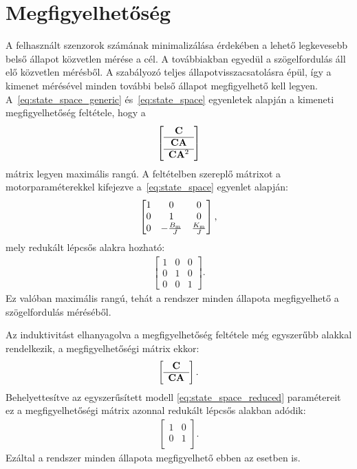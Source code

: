 \section{Megfigyelhetőség}\label{chap:observability}
A felhasznált szenzorok számának minimalizálása érdekében a lehető legkevesebb belső állapot közvetlen mérése 
a cél. A továbbiakban egyedül a szögelfordulás áll elő közvetlen mérésből. 
A szabályozó teljes állapotvisszacsatolásra épül, így a kimenet mérésével minden további belső állapot 
megfigyelhető kell legyen. 
A~\eqref{eq:state_space_generic} és~\eqref{eq:state_space} egyenletek alapján a kimeneti megfigyelhetőség feltétele, hogy a
\begin{align}\label{eq:observability_generic}
    \left[\begin{array}{c}
        \mathbf{C} \\ \hline
        \mathbf{CA} \\ \hline
        \mathbf{C} \mathbf{A}^2
    \end{array}\right]
\end{align}
mátrix legyen maximális rangú. A feltételben szereplő mátrixot a motorparaméterekkel kifejezve 
a~\eqref{eq:state_space} egyenlet alapján:
\begin{align}
    \begin{bmatrix}
        1 & 0 & 0 \\
        0 & 1 & 0 \\
        0 & -\frac{B_{\mathrm{m}}}{J} & \frac{K_{\mathrm{m}}}{J}
    \end{bmatrix},
\end{align}
mely redukált lépcsős alakra hozható:
\begin{align}
    \begin{bmatrix}
        1 & 0 & 0 \\
        0 & 1 & 0 \\
        0 & 0 & 1
    \end{bmatrix}.
\end{align}
Ez valóban maximális rangú, tehát a rendszer minden állapota megfigyelhető a szögelfordulás méréséből.

Az induktivitást elhanyagolva a megfigyelhetőség feltétele
még egyszerűbb alakkal rendelkezik, a megfigyelhetőségi mátrix ekkor:
\begin{align}
	\left[\begin{array}{c}
		\mathbf{C} \\ \hline
		\mathbf{CA} \\
	\end{array}\right].
\end{align}
Behelyettesítve az egyszerűsített modell \eqref{eq:state_space_reduced} paramétereit ez a megfigyelhetőségi mátrix azonnal redukált lépcsős alakban adódik:
\begin{align}
    \begin{bmatrix}
        1 & 0 \\
        0 & 1 \\
    \end{bmatrix}.
\end{align}
Ezáltal a rendszer minden állapota megfigyelhető ebben az esetben is. 


